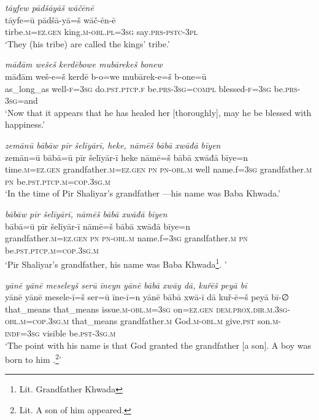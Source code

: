 \ea \label{ŽP.252}
\textit{tāyfew pādšāyāš wāčēnē} \\ 
\gll tāyfe=ū pādšā-yā=š wāč-ēn-ē \\ 
 tirbe\textsc{.m}\textsc{\textsc{=ez.gen}} king\textsc{.m}\textsc{-obl}\textsc{.pl}\textsc{=3sg} say\textsc{.prs-pstc-3pl} \\ 
\glt `They (his tribe) are called the kings’ tribe.'
\z 
 
\ea \label{ŽP.261}
\textit{māđām wešeš kerdēbowe mubārekeš bonew} \\ 
\gll māđām weš-e=š kerdē b-o=we mubārek-e=š b-one=ū \\ 
 as\_long\_as well\textsc{-f}\textsc{=3sg} do\textsc{.pst}\textsc{.ptcp}\textsc{.f} be\textsc{.prs}\textsc{-3sg}\textsc{=compl} blessed\textsc{-f}\textsc{=3sg} be\textsc{.prs}\textsc{-3sg}=and \\ 
\glt `Now that it appears that he has healed her [thoroughly], may he be blessed with happiness.'
\z 
 
\ea \label{BP.1}
\textit{zemānū bābāw pīr šelīyārī, heke, nāmēš bābā xwāđā bīyen} \\ 
\gll zemān=ū bābā=ū pīr šelīyār-ī heke nāmē=š bābā xwāđā bīye=n \\ 
 time\textsc{.m}\textsc{=ez.gen} grandfather\textsc{.m}\textsc{=ez.gen} \textsc{pn} \textsc{pn}\textsc{-obl}\textsc{.m} well name.f\textsc{=3sg} grandfather\textsc{.m} \textsc{pn} be\textsc{.pst}\textsc{.ptcp}\textsc{.m}\textsc{=cop}\textsc{.3sg}\textsc{.m} \\ 
\glt `In the time of Pir Shaliyar’s grandfather —his name was Baba Khwada.'
\z 
 
\ea \label{BP.2}
\textit{bābāw pīr šelīyārī, nāmēš bābā xwāđā bīyen} \\ 
\gll bābā=ū pīr šelīyār-ī nāmē=š bābā xwāđā bīye=n \\ 
 grandfather\textsc{.m}\textsc{=ez.gen} \textsc{pn} \textsc{pn}\textsc{-obl}\textsc{.m} name.f\textsc{=3sg} grandfather\textsc{.m} \textsc{pn} be\textsc{.pst}\textsc{.ptcp}\textsc{.m}\textsc{=cop}\textsc{.3sg}\textsc{.m} \\ 
\glt `Pir Shaliyar’s grandfather, his name was Baba Khwada\footnote{Lit. Grandfather Khwada}. '
\z 
 
\ea \label{BP.3}
\textit{yānē yānē meseleyš serū īneyn yānē bābā xwāy dā, kuřēš peyā bī} \\ 
\gll yānē yānē mesele-ī=š ser=ū īne-ī=n yānē bābā xwā-ī dā kuř-ē=š peyā bī-∅ \\ 
 that\_means that\_means issue\textsc{.m}\textsc{-obl}\textsc{.m}\textsc{=3sg} on\textsc{=ez.gen} \textsc{dem.prox}\textsc{.dir}\textsc{.m}\textsc{.3sg}\textsc{-obl}\textsc{.m}\textsc{=cop}\textsc{.3sg}\textsc{.m} that\_means grandfather\textsc{.m} God\textsc{.m}\textsc{-obl}\textsc{.m} give\textsc{.pst} son\textsc{.m}\textsc{-indf}\textsc{=3sg} visible be\textsc{.pst}\textsc{-3sg}\textsc{.m} \\ 
\glt `The point with his name is that God granted the grandfather [a son]. A boy  was born to him .\footnote{Lit. A son of him appeared.}'
\z 
 

